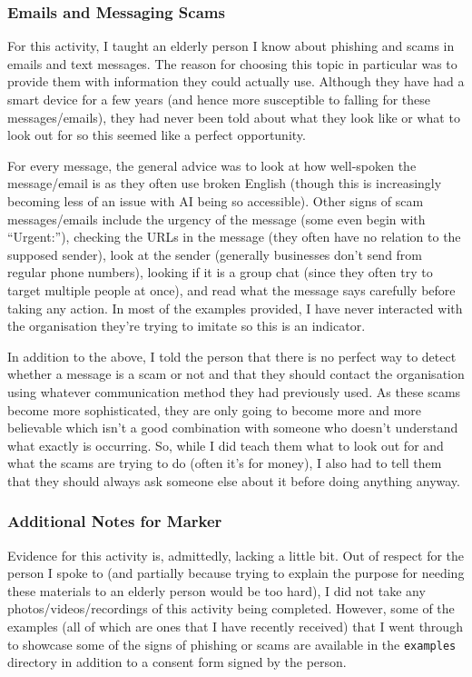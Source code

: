 \hypertarget{emails-and-messaging-scams}{%
\subsubsection{Emails and Messaging
Scams}\label{emails-and-messaging-scams}}

For this activity, I taught an elderly person I know about phishing and
scams in emails and text messages. The reason for choosing this topic in
particular was to provide them with information they could actually use.
Although they have had a smart device for a few years (and hence more
susceptible to falling for these messages/emails), they had never been
told about what they look like or what to look out for so this seemed
like a perfect opportunity.

For every message, the general advice was to look at how well-spoken the
message/email is as they often use broken English (though this is
increasingly becoming less of an issue with AI being so accessible).
Other signs of scam messages/emails include the urgency of the message
(some even begin with ``Urgent:''), checking the URLs in the message
(they often have no relation to the supposed sender), look at the sender
(generally businesses don't send from regular phone numbers), looking if
it is a group chat (since they often try to target multiple people at
once), and read what the message says carefully before taking any
action. In most of the examples provided, I have never interacted with
the organisation they're trying to imitate so this is an indicator.

In addition to the above, I told the person that there is no perfect way
to detect whether a message is a scam or not and that they should
contact the organisation using whatever communication method they had
previously used. As these scams become more sophisticated, they are only
going to become more and more believable which isn't a good combination
with someone who doesn't understand what exactly is occurring. So, while
I did teach them what to look out for and what the scams are trying to
do (often it's for money), I also had to tell them that they should
always ask someone else about it before doing anything anyway.

\hypertarget{additional-notes-for-marker}{%
\subsubsection{Additional Notes for
Marker}\label{additional-notes-for-marker}}

Evidence for this activity is, admittedly, lacking a little bit. Out of
respect for the person I spoke to (and partially because trying to
explain the purpose for needing these materials to an elderly person
would be too hard), I did not take any photos/videos/recordings of this
activity being completed. However, some of the examples (all of which
are ones that I have recently received) that I went through to showcase
some of the signs of phishing or scams are available in the
\texttt{examples} directory in addition to a consent form signed by the
person.
